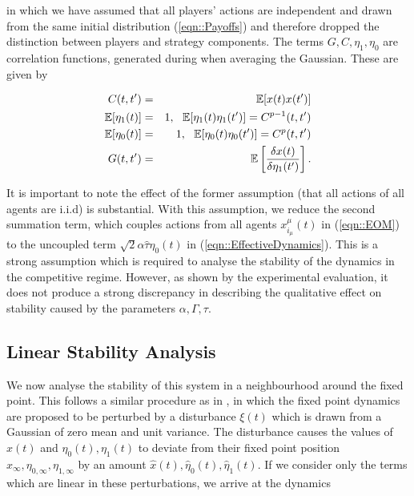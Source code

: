 \documentclass[sigconf,anonymous]{aamas}
\newcommand{\xmu}[2]{x_{#1_#2}^{#2}(t)}
\newcommand{\htau}{\hat{\tau}}
\newcommand{\xfixed}{x_\infty}
\newcommand{\ezerof}{\eta_{0, \infty}}
\newcommand{\eonef}{\eta_{1, \infty}}
\newcommand{\xpert}{\hat{x}(t)}
\newcommand{\ezeropert}{\hat{\eta}_0(t)}
\newcommand{\eonepert}{\hat{\eta}_1(t)}
\begin{document}
in which we have assumed that all players' actions are independent and drawn from the same initial distribution (\ref{eqn::Payoffs})
and therefore dropped the distinction between players and strategy components. The terms $G, C, \eta_1, \eta_0$ are correlation functions, generated during when averaging the Gaussian. These are given by 

\begin{eqnarray*}
        C(t, t') & = & \mathbb{E}[x(t) x(t')] \\
        \mathbb{E}[\eta_1(t)] & = & 1, \text{ \space } \mathbb{E}[\eta_1(t) \eta_1(t')]  =  C^{p-1}(t, t') \\
        \mathbb{E}[\eta_0(t)] & = & 1, \text{ \space } \mathbb{E}[\eta_0(t) \eta_0(t')] = C^{p}(t, t') \\
        G(t, t') & = & \mathbb{E}\left [ \frac{\delta x(t)}{ \delta \eta_1(t')} \right].
\end{eqnarray*}

It is important to note the effect of the former assumption (that all actions of all agents are i.i.d) is substantial. With this assumption, we reduce the second summation term, which couples actions from all agents $\xmu{i}{\mu}$ in (\ref{eqn::EOM}) to the uncoupled term $\sqrt{2} \alpha \htau \eta_0(t)$ in (\ref{eqn::EffectiveDynamics}). This is a strong assumption which is required to analyse the stability of the dynamics in the competitive regime. However, as shown by the experimental evaluation, it does not produce a strong discrepancy in describing the qualitative effect on stability caused by the parameters $\alpha, \Gamma, \tau$.


\subsection{Linear Stability Analysis}

We now analyse the stability of this system in a neighbourhood around the fixed point. This follows a similar procedure as in \cite{Opper1992}, in which the fixed point dynamics are proposed to be perturbed by a disturbance $\xi(t)$ which is drawn from a Gaussian of zero mean and unit variance. The disturbance causes the values of $x(t)$ and $\eta_0(t), \eta_1(t)$ to deviate from their fixed point position $\xfixed, \ezerof, \eonef$ by an amount $\xpert, \ezeropert, \eonepert$.
If we consider only the terms which are linear in these perturbations, we arrive at the dynamics
\end{document}
